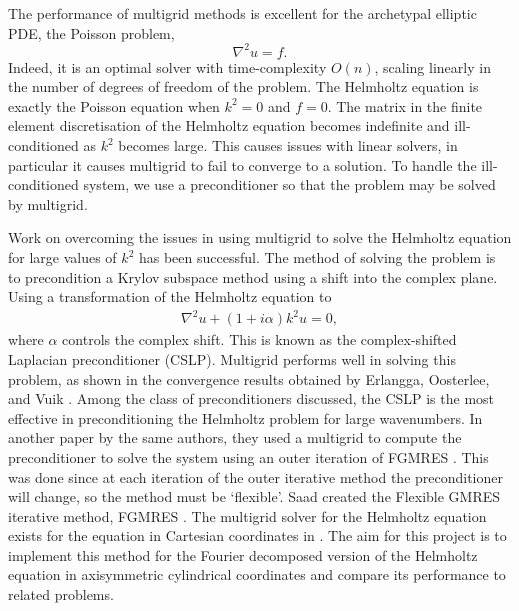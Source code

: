 The performance of multigrid methods is excellent for the archetypal elliptic PDE, the Poisson problem,
\begin{equation}
	\nabla^2 u = f. \label{eqn:poisson}
\end{equation}
Indeed, it is an optimal solver with time-complexity $O(n)$, scaling linearly in the number of degrees of freedom of the problem.
The Helmholtz equation is exactly the Poisson equation when $k^2=0$ and $f=0$.
The matrix in the finite element discretisation of the Helmholtz equation becomes indefinite and ill-conditioned as $k^2$ becomes large.
This causes issues with linear solvers, in particular it causes multigrid to fail to converge to a solution.
To handle the ill-conditioned system, we use a preconditioner so that the problem may be solved by multigrid.


Work on overcoming the issues in using multigrid to solve the Helmholtz equation for large values of $k^2$ has been successful.
The method of solving the problem is to precondition a Krylov subspace method using a shift into the complex plane.
Using a transformation of the Helmholtz equation to
\begin{align}
	\nabla^2 u + (1+i\alpha)k^2 u = 0,
\end{align}
where $\alpha$ controls the complex shift.
This is known as the complex-shifted Laplacian preconditioner (CSLP).
Multigrid performs well in solving this problem, as shown in the convergence results obtained by Erlangga, Oosterlee, and Vuik \cite{cslp1}.
Among the class of preconditioners discussed, the CSLP is the most effective in preconditioning the Helmholtz problem for large wavenumbers.
In another paper by the same authors, they used a multigrid to compute the preconditioner to solve the system using an outer iteration of FGMRES \cite{cslp2}.
This was done since at each iteration of the outer iterative method the preconditioner will change, so the method must be `flexible'.
Saad created the Flexible GMRES iterative method, FGMRES \cite{fgmres}.
The multigrid solver for the Helmholtz equation exists for the equation in Cartesian coordinates in \oomph.
The aim for this project is to implement this method for the Fourier decomposed version of the Helmholtz equation in axisymmetric cylindrical coordinates and compare its performance to related problems.






